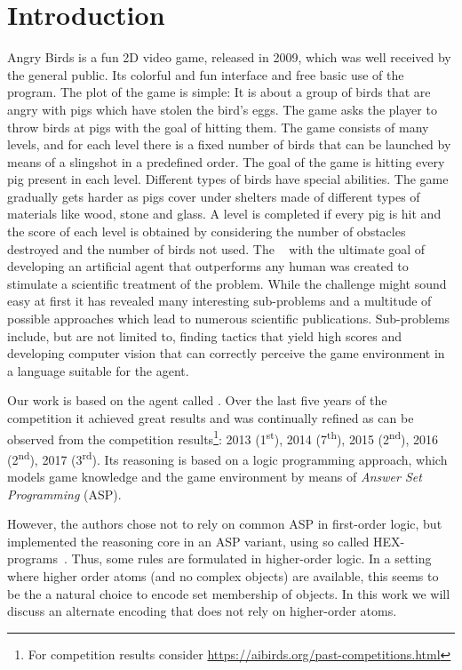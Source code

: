 \section{Introduction}
\label{sec:intro}

Angry Birds is a fun 2D video game, released in 2009, which was well received by the general public. Its colorful and fun interface and free basic use of
the program. The plot of the game is simple: It is about a group of birds that are angry with pigs which have stolen the bird's eggs. The game asks the player to throw birds at pigs with the goal of hitting them. The game consists of many levels, and for each level there is a fixed number of birds that can be launched by means of a slingshot in a predefined order. The goal of the game is hitting every pig present in each level. Different types of birds have special abilities. The game gradually gets harder as pigs cover under shelters made of different types of materials like wood, stone and glass. A level is completed if every pig is hit and the score of each level is obtained by considering the number of obstacles destroyed and the number of birds not used.
The \abc~\cite{angryAI} with the ultimate goal of developing an artificial agent that outperforms any human was created to stimulate a scientific treatment of the problem. While the challenge might sound easy at first it has revealed many interesting sub-problems and a multitude of possible approaches which lead to numerous scientific publications.
Sub-problems include, but are not limited to, finding tactics that yield high scores and developing computer vision that can correctly perceive the game environment in a language suitable for the agent.

Our work is based on the agent called \ah \cite{angryhex}. Over the last five years of the competition it achieved great results and was continually refined as can be observed from the competition results\footnote{For competition results consider \url{https://aibirds.org/past-competitions.html}}: 2013 (1\textsuperscript{st}), 2014 (7\textsuperscript{th}), 2015 (2\textsuperscript{nd}), 2016 (2\textsuperscript{nd}), 2017 (3\textsuperscript{rd}). Its reasoning is based on a logic programming approach, which models game knowledge and the game environment by means of \emph{Answer Set Programming} (ASP).

However, the authors chose not to rely on common ASP in first-order logic, but implemented the reasoning core in an ASP variant, using so called HEX-programs~\cite{hex}. Thus, some rules are formulated in higher-order logic. In a setting where higher order atoms (and no complex objects) are available, this seems to be the a natural choice to encode set membership of objects. In this work we will discuss an alternate encoding that does not rely on higher-order atoms.

